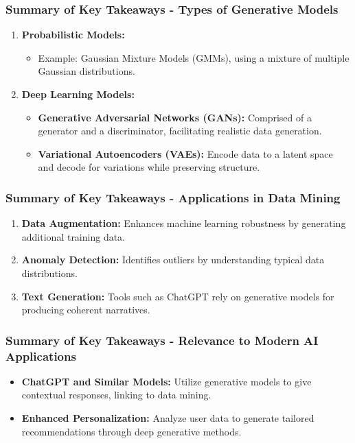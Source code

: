 \documentclass[aspectratio=169]{beamer}
\begin{document}
\begin{frame}[fragile]
    \frametitle{Summary of Key Takeaways - Types of Generative Models}
    \begin{enumerate}
        \item \textbf{Probabilistic Models:} 
        \begin{itemize}
            \item Example: Gaussian Mixture Models (GMMs), using a mixture of multiple Gaussian distributions.
        \end{itemize}
        \item \textbf{Deep Learning Models:} 
        \begin{itemize}
            \item \textbf{Generative Adversarial Networks (GANs):} 
                Comprised of a generator and a discriminator, facilitating realistic data generation.
            \item \textbf{Variational Autoencoders (VAEs):} 
                Encode data to a latent space and decode for variations while preserving structure.
        \end{itemize}
    \end{enumerate}
\end{frame}

\begin{frame}[fragile]
    \frametitle{Summary of Key Takeaways - Applications in Data Mining}
    \begin{enumerate}
        \item \textbf{Data Augmentation:} 
        Enhances machine learning robustness by generating additional training data.
        \item \textbf{Anomaly Detection:} 
        Identifies outliers by understanding typical data distributions.
        \item \textbf{Text Generation:} 
        Tools such as ChatGPT rely on generative models for producing coherent narratives.
    \end{enumerate}
\end{frame}

\begin{frame}[fragile]
    \frametitle{Summary of Key Takeaways - Relevance to Modern AI Applications}
    \begin{itemize}
        \item \textbf{ChatGPT and Similar Models:} 
        Utilize generative models to give contextual responses, linking to data mining.
        \item \textbf{Enhanced Personalization:} 
        Analyze user data to generate tailored recommendations through deep generative methods.
    \end{itemize}
\end{frame}
\end{document}
